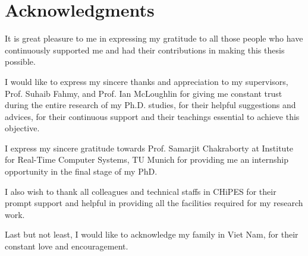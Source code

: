 \chapter* {Acknowledgments}

It is great pleasure to me in expressing my gratitude to all those people who have continuously
supported me and had their contributions in making this thesis possible.

I would like to express my sincere thanks and appreciation to my supervisors, Prof. Suhaib Fahmy, and Prof. Ian McLoughlin for giving me constant trust during the entire research of my Ph.D. studies, for their helpful suggestions and advices, for their continuous support and their teachings essential to achieve this objective.

I express my sincere gratitude towards Prof. Samarjit Chakraborty at Institute for Real-Time Computer Systems, TU Munich for providing me an internship opportunity in the final stage of my PhD.

I also wish to thank all colleagues and technical staffs in CHiPES for their prompt support and helpful in providing all the facilities required for my research work.


Last but not least, I would like to acknowledge my family in Viet Nam, for their constant love and encouragement.
